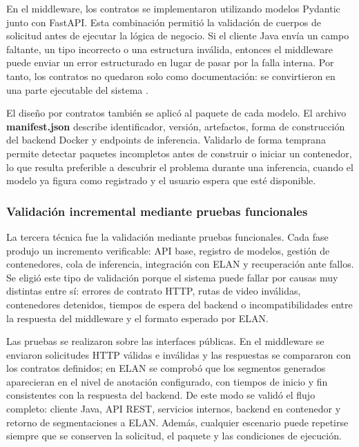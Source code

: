 \documentclass[11pt,a4paper]{article}
\begin{document}
En el middleware, los contratos se implementaron utilizando modelos Pydantic junto con FastAPI. Esta combinación permitió la validación de cuerpos de solicitud antes de ejecutar la lógica de negocio. Si el cliente Java envía un campo faltante, un tipo incorrecto o una estructura inválida, entonces el middleware puede enviar un error estructurado en lugar de pasar por la falla interna. Por tanto, los contratos no quedaron solo como documentación: se convirtieron en una parte ejecutable del sistema \cite{pydantic2026models,fastapi2026features}.

El diseño por contratos también se aplicó al paquete de cada modelo. El archivo \textbf{manifest.json} describe identificador, versión, artefactos, forma de construcción del backend Docker y endpoints de inferencia. Validarlo de forma temprana permite detectar paquetes incompletos antes de construir o iniciar un contenedor, lo que resulta preferible a descubrir el problema durante una inferencia, cuando el modelo ya figura como registrado y el usuario espera que esté disponible.

\subsubsection{Validación incremental mediante pruebas funcionales}

La tercera técnica fue la validación mediante pruebas funcionales. Cada fase produjo un incremento verificable: API base, registro de modelos, gestión de contenedores, cola de inferencia, integración con ELAN y recuperación ante fallos. Se eligió este tipo de validación porque el sistema puede fallar por causas muy distintas entre sí: errores de contrato HTTP, rutas de video inválidas, contenedores detenidos, tiempos de espera del backend o incompatibilidades entre la respuesta del middleware y el formato esperado por ELAN.

Las pruebas se realizaron sobre las interfaces públicas. En el middleware se enviaron solicitudes HTTP válidas e inválidas y las respuestas se compararon con los contratos definidos; en ELAN se comprobó que los segmentos generados aparecieran en el nivel de anotación configurado, con tiempos de inicio y fin consistentes con la respuesta del backend. De este modo se validó el flujo completo: cliente Java, API REST, servicios internos, backend en contenedor y retorno de segmentaciones a ELAN. Además, cualquier escenario puede repetirse siempre que se conserven la solicitud, el paquete y las condiciones de ejecución.
\end{document}
